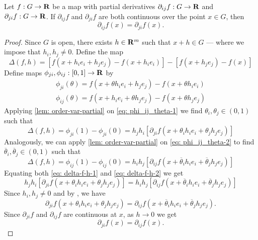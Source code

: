 \begin{theorem}
  \label{thm: order-var-partial}
  Let \(f: G \to \mathbf{R}\) be a map with partial derivatives \(\partial_{i j} f: G
  \to \mathbf{R}\) and \(\partial_{j i} f: G \to \mathbf{R}\). If \(\partial_{i j} f\) and
  \(\partial_{j i} f\) are both continuous over the point \(x \in G\), then
  \[
    \partial_{i j} f(x) = \partial_{j i} f(x).
  \]
\end{theorem}

\begin{proof}
  Since \(G\) is open, there exists \(h \in \mathbf{R}^m\) such that \(x + h \in G\) ---
  where we impose that \(h_i, h_j \neq 0\). Define the map
  \begin{equation}\label{eq: order-var-partial-1}
    \Delta(f, h) =
    [f(x + h_i e_i + h_j e_j) - f(x + h_i e_i)] - [f(x + h_j e_j) - f(x)]
  \end{equation}
  Define maps \(\phi_{ji}, \phi_{ij}: [0, 1] \to \mathbf{R}\) by
  \begin{gather}
    \label{eq: phi_ij_theta-1}
    \phi_{ji}(\theta) = f(x + \theta h_i e_i + h_j e_j) - f(x + \theta h_i e_i)
    \\
    \label{eq: phi_ij_theta-2}
    \phi_{ij}(\theta) = f(x + h_i e_i + \theta h_j e_j) - f(x + \theta h_j e_j)
  \end{gather}
  Applying \cref{lem: order-var-partial} on \cref{eq: phi_ij_theta-1} we find
  \(\theta_i, \theta_j \in (0, 1)\) such that
  \begin{equation}\label{eq: delta-f-h-1}
    \Delta(f, h) = \phi_{ji}(1) - \phi_{ji}(0)
    = h_j h_i [\partial_{ji} f(x + \theta_i h_i e_i + \theta_j h_j e_j)]
  \end{equation}
  Analogously, we can apply \cref{lem: order-var-partial} on \cref{eq:
  phi_ij_theta-2} to find \(\overline \theta_i, \overline \theta_j \in (0, 1)\)
  such that
  \begin{equation}\label{eq: delta-f-h-2}
    \Delta(f, h) = \phi_{ij}(1) - \phi_{ij}(0)
    = h_i h_j [\partial_{ij} f(x + \overline \theta_i h_i e_i + \overline
    \theta_j h_j e_j)]
  \end{equation}
  Equating both \cref{eq: delta-f-h-1} and \cref{eq: delta-f-h-2} we get
  \[
    h_j h_i [\partial_{ji} f(x + \theta_i h_i e_i + \theta_j h_j e_j)]
    = h_i h_j [\partial_{ij} f(x + \overline \theta_i h_i e_i + \overline
    \theta_j h_j e_j)]
  \]
  Since \(h_i, h_j \neq 0\) and by , we have
  \[
    \partial_{ji} f(x + \theta_i h_i e_i + \theta_j h_j e_j)
    = \partial_{ij} f(x + \overline \theta_i h_i e_i + \overline \theta_j h_j
    e_j).
  \]
  Since \(\partial_{ji} f\) and \(\partial_{ij} f\) are continuous at \(x\), as
  \(h \to 0\) we get
  \[
    \partial_{ji} f(x) = \partial_{ij} f(x).
  \]
\end{proof}

